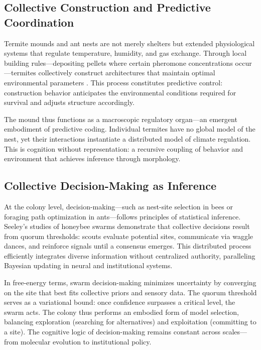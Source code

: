 \documentclass[11pt,a4paper]{article}
\begin{document}
\subsection{Collective Construction and Predictive Coordination}

Termite mounds and ant nests are not merely shelters but extended physiological systems that regulate temperature, humidity, and gas exchange.  Through local building rules—depositing pellets where certain pheromone concentrations occur—termites collectively construct architectures that maintain optimal environmental parameters \citep{Camazine2001SelfOrganizationBiologicalSystems}.  This process constitutes predictive control: construction behavior anticipates the environmental conditions required for survival and adjusts structure accordingly.

The mound thus functions as a macroscopic regulatory organ—an emergent embodiment of predictive coding.  Individual termites have no global model of the nest, yet their interactions instantiate a distributed model of climate regulation.  This is cognition without representation: a recursive coupling of behavior and environment that achieves inference through morphology.

\subsection{Collective Decision-Making as Inference}

At the colony level, decision-making—such as nest-site selection in bees or foraging path optimization in ants—follows principles of statistical inference.  Seeley’s studies of honeybee swarms \citep{Seeley2010HoneybeeDemocracy} demonstrate that collective decisions result from quorum thresholds: scouts evaluate potential sites, communicate via waggle dances, and reinforce signals until a consensus emerges.  This distributed process efficiently integrates diverse information without centralized authority, paralleling Bayesian updating in neural and institutional systems.

In free-energy terms, swarm decision-making minimizes uncertainty by converging on the site that best fits collective priors and sensory data.  The quorum threshold serves as a variational bound: once confidence surpasses a critical level, the swarm acts.  The colony thus performs an embodied form of model selection, balancing exploration (searching for alternatives) and exploitation (committing to a site).  The cognitive logic of decision-making remains constant across scales—from molecular evolution to institutional policy.
\end{document}
